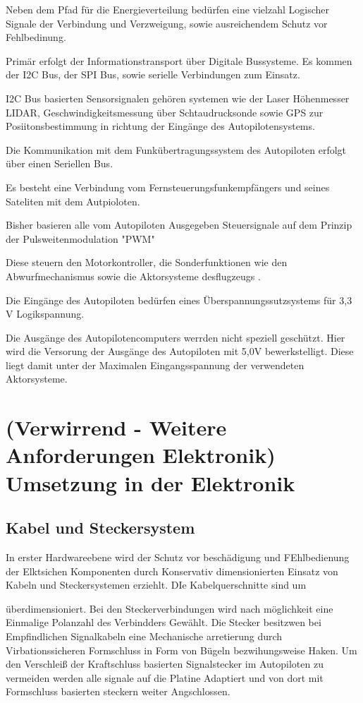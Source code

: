 Neben dem Pfad für die Energieverteilung bedürfen eine vielzahl Logischer Signale der Verbindung und Verzweigung, sowie ausreichendem Schutz vor Fehlbedinung.

Primär erfolgt der Informationstransport über Digitale Bussysteme. Es kommen der I2C Bus, der SPI Bus, sowie serielle Verbindungen zum Einsatz.

I2C  Bus basierten Sensorsignalen gehören systemen wie der Laser Höhenmesser LIDAR, Geschwindigkeitsmessung über Schtaudrucksonde sowie GPS zur Posiitonsbestimmung in richtung der Eingänge des Autopilotensystems.

Die Kommunikation mit dem Funkübertragungssystem des Autopiloten erfolgt über einen Seriellen Bus.

Es besteht eine Verbindung vom Fernsteuerungsfunkempfängers und seines Sateliten mit dem Autpioloten.

Bisher basieren alle vom Autopiloten Ausgegeben Steuersignale auf dem Prinzip der Pulsweitenmodulation "PWM"

Diese steuern den Motorkontroller, die Sonderfunktionen wie den Abwurfmechanismus sowie die Aktorsysteme desflugzeugs .


Die Eingänge des Autopiloten bedürfen eines Überspannungssutzsystems für 3,3 V Logikspannung.

Die Ausgänge des Autopilotencomputers werrden nicht speziell geschützt. Hier wird die Versorung der Ausgänge des Autopiloten mit 5,0V bewerkstelligt. Diese liegt damit unter der  Maximalen Eingangsspannung der verwendeten Aktorsysteme.


\section{(Verwirrend - Weitere Anforderungen Elektronik) Umsetzung in der Elektronik}

\subsection{Kabel und Steckersystem}

In erster Hardwareebene  wird der Schutz vor beschädigung und FEhlbedienung der Elktsichen Komponenten durch Konservativ dimensionierten Einsatz von Kabeln und Steckersystemen erziehlt. DIe Kabelquerschnitte sind um
\begin{comment} Prozentzahl ?\end{comment}
überdimensioniert. Bei den Steckerverbindungen wird nach möglichkeit eine Einmalige Polanzahl des Verbindders Gewählt.
Die Stecker besitzwen bei Empfindlichen Signalkabeln eine Mechanische arretierung durch Virbationssicheren Formschluss in Form von Bügeln bezwihungsweise Haken.
Um den Verschleiß der Kraftschluss basierten Signalstecker im Autopiloten zu vermeiden werden alle signale auf die Platine Adaptiert und von dort mit Formschluss basierten steckern weiter  Angschlossen.

